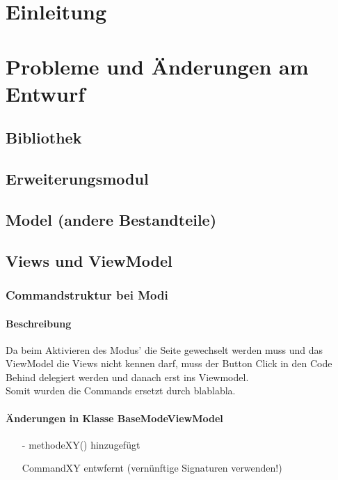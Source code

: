 \documentclass[a4paper,12pt]{article}
\title{\projektName}
\date{\today}
\author{Tec O'Brain}
\begin{document}
 \setcounter{page}{2}
 \tableofcontents          %
 \clearpage

\section{Einleitung}
\section{Probleme und Änderungen am Entwurf}

\subsection{Bibliothek}

\subsection{Erweiterungsmodul}

\subsection{Model (andere Bestandteile)}

\subsection{Views und ViewModel}
\subsubsection{Commandstruktur bei Modi}
\paragraph{Beschreibung}
Da beim Aktivieren des Modus' die Seite gewechselt werden muss und das ViewModel die Views nicht kennen darf, muss der Button Click in den Code Behind delegiert werden und danach erst ins Viewmodel.\\
Somit wurden die Commands ersetzt durch blablabla.
\paragraph{Änderungen in Klasse BaseModeViewModel}
\begin{itemize}
  \item[-] methodeXY() hinzugefügt
  \item[] CommandXY entwfernt (vernünftige Signaturen verwenden!)
\end{itemize}
\end{document}
